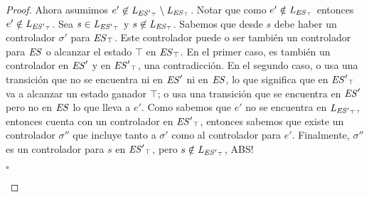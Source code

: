 \begin{proof}
Ahora asumimos $e' \not\in \mathit{L_{\mathit{{\mathit{ES}'}_{\top}}}} \setminus \mathit{L_{\mathit{{\mathit{ES}}_{\top}}}}$. Notar que como $e' \notin \mathit{L_{\mathit{{\mathit{ES}}_{\top}}}}$ entonces $e' \notin \mathit{L_{\mathit{{\mathit{ES}'}_{\top}}}}$. Sea $s \in \mathit{L_{\mathit{{\mathit{ES}'}_{\top}}}}$ y $s \not\in \mathit{L_{\mathit{{\mathit{ES}}_{\top}}}}$. Sabemos que desde $s$ debe haber un controlador $\sigma'$ para  $\mathit{{\mathit{ES}}_{\top}}$. Este controlador puede o ser también un controlador para $\mathit{ES}$ o alcanzar el estado $\top$ en $\mathit{{\mathit{ES}}_{\top}}$. En el primer caso, es también un controlador en $\mathit{ES}'$ y en $\mathit{{\mathit{ES}'}_{\top}}$, una contradicción. En el segundo caso, o usa una transición que no se encuentra ni en $\mathit{ES}'$ ni en $\mathit{ES}$, lo que significa que en $\mathit{{\mathit{ES}'}_{\top}}$ va a alcanzar un estado ganador $\top$; o usa una transición que se encuentra en $\mathit{ES}'$ pero no en $\mathit{ES}$ lo que lleva a $e'$. Como sabemos que $e'$ no se encuentra en $\mathit{L_{\mathit{{\mathit{ES}'}_{\top}}}}$, entonces cuenta con un controlador en  $\mathit{{\mathit{ES}'}_{\top}}$, entonces sabemos que existe un controlador $\sigma''$ que incluye tanto a  $\sigma'$ como al controlador para $e'$. Finalmente, $\sigma''$ es un controlador para $s$ en  $\mathit{{\mathit{ES}'}_{\top}}$, pero $s \notin \mathit{L_{\mathit{{\mathit{ES}'}_{\top}}}}$, ABS!	
\begin{flushright}
	$\square$
\end{flushright}
\end{proof}

